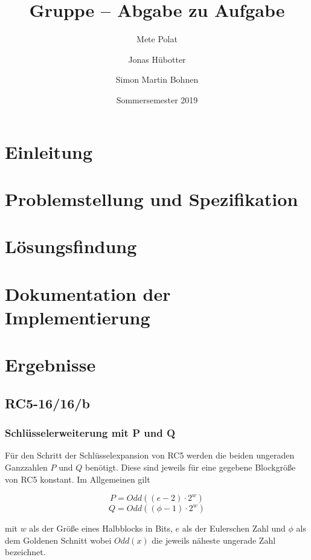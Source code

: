 \documentclass[course=erap]{aspdoc}
\author{Mete Polat \and Jonas Hübotter \and Simon Martin Bohnen}
\date{Sommersemester 2019} %
\title{Gruppe \theGroup{} -- Abgabe zu Aufgabe \theNumber}
\begin{document}
\maketitle

\section{Einleitung}


\section{Problemstellung und Spezifikation}


\section{Lösungsfindung}


\section{Dokumentation der Implementierung}


\section{Ergebnisse}

\subsection{RC5-16/16/b}

\subsubsection{Schlüsselerweiterung mit P und Q}

Für den Schritt der Schlüsselexpansion von RC5 werden die beiden ungeraden Ganzzahlen $P$ und $Q$ benötigt. Diese sind jeweils für eine gegebene Blockgröße von RC5 konstant. Im Allgemeinen gilt

\begin{equation}
    P = Odd((e - 2) \cdot 2^w)
\end{equation}
\begin{equation}
    Q = Odd((\phi - 1) \cdot 2^w)
\end{equation}

mit $w$ als der Größe eines Halbblocks in Bits, $e$ als der Eulerschen Zahl und $\phi$ als dem Goldenen Schnitt wobei $Odd(x)$ die jeweils näheste ungerade Zahl bezeichnet.\bigbreak
\end{document}
